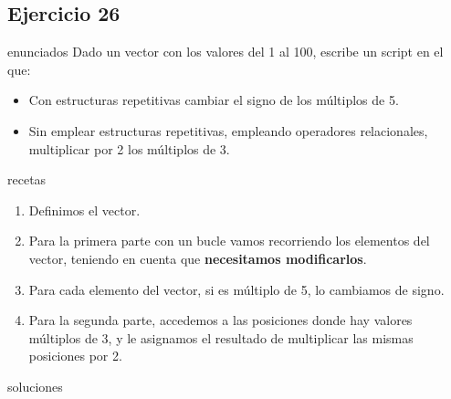 \subsection{Ejercicio 26}
\def\parte{enunciados}
\ifx\capitulo\parte
Dado un vector con los valores del 1 al 100, escribe un script en el que:

\begin{itemize}
\item Con estructuras repetitivas cambiar el signo de los múltiplos de 5.
\item Sin emplear estructuras repetitivas, empleando operadores relacionales, multiplicar por 2 los múltiplos de 3.
\end{itemize}
\fi

\def\parte{recetas}
\ifx\capitulo\parte
\begin{enumerate}
\item Definimos el vector.
\item Para la primera parte con un bucle  vamos recorriendo los elementos del vector, teniendo en cuenta que \textbf{necesitamos modificarlos}.
\item Para cada elemento del vector, si es múltiplo de 5, lo cambiamos de signo.
\item Para la segunda parte, accedemos a las posiciones donde hay valores múltiplos de 3, y le asignamos el resultado de multiplicar las mismas posiciones por 2.
\end{enumerate}
\fi

\def\parte{soluciones}
\ifx\capitulo\parte

\fi
